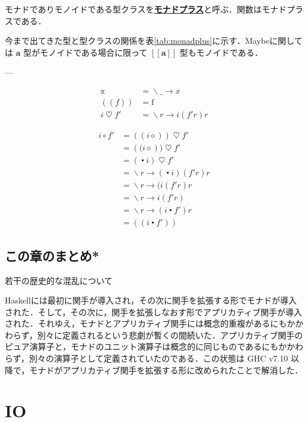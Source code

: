 \documentclass[a4paper,twocolumn]{jsbook}
\def\[{\left[\!\left[}
\def\]{\right]\!\right]}
\def\({\left(\!\left(}
\def\){\right)\!\right)}
\newcommand{\programminglanguage}[1]{\textsf{#1}}
\newcommand{\haskell}{\programminglanguage{Haskell}}
\newenvironment{note}[1]{\begin{boxnote}\begin{center}#1\end{center}}{\end{boxnote}}
\newcommand{\keyword}[1]{{\underline{\textbf{#1}}}}
\newcommand{\mConst}[1]{\mathrm{#1}}
\newcommand{\mAnonParam}{\diamond}
\newcommand{\mAnyParam}{\_}
\DeclareMathOperator{\mConst}{const}
\DeclareMathOperator{\mBind}{\heartsuit}
\DeclareMathOperator{\mComp}{\centerdot}
\DeclareMathOperator{\mLambda}{\backslash}
\DeclareMathOperator{\mLambdaArrow}{\rightarrow}
\DeclareMathOperator{\mMapFunc}{\circ}
\newcommand{\mType}[1]{\mathbf{#1}}
\newcommand{\mFuncWith}[1]{\(#1\)}
\newcommand{\mMaybeWith}[1]{\[#1\]}
\newcommand{\mMaybeType}[1]{\mMaybeWith{\mType{#1}}}
\newcommand{\mLambdaExp}[2]{\mLambda{#1}\mLambdaArrow{#2}}
\begin{document}
モナドでありモノイドである型クラスを\keyword{モナドプラス}と呼ぶ．関数はモナドプラスである．

今まで出てきた型と型クラスの関係を表\ref{tab:monadplus}に示す．Maybeに関しては $\mType{a}$ 型がモノイドである場合に限って $\mMaybeType{a}$ 型もモノイドである．

---



\begin{align}
\mConst x&=\mLambdaExp{\mAnyParam}{x}\\
\mFuncWith{f}&=\mConst f\\
i\mBind f'&=\mLambdaExp{r}{i(f'r)r}
\end{align}


\begin{align}
i\mMapFunc f'&=\mFuncWith{i\mAnonParam}\mBind f'\\
&=(\mConst(i\mAnonParam))\mBind f'\\
&=(\mConst\mComp i)\mBind f'\\
&=\mLambdaExp{r}{(\mConst\mComp i)(f'r)r}\\
&=\mLambdaExp{r}{\mConst(i(f'r)r}\\
&=\mLambdaExp{r}{i(f'r)}\\
&=\mLambdaExp{r}{(i\mComp f')r}\\
&=\mFuncWith{i\mComp f'} %
\end{align}



\section{この章のまとめ*}

\begin{note}{若干の歴史的な混乱について}
\haskell には最初に関手が導入され，その次に関手を拡張する形でモナドが導入された．そして，その次に，関手を拡張しなおす形でアプリカティブ関手が導入された．それゆえ，モナドとアプリカティブ関手には概念的重複があるにもかかわらず，別々に定義されるという悲劇が暫くの間続いた．アプリカティブ関手のピュア演算子と，モナドのユニット演算子は概念的に同じものであるにもかかわらず，別々の演算子として定義されていたのである．この状態は GHC v7.10 以降で，モナドがアプリカティブ関手を拡張する形に改められたことで解消した．
\end{note}


\chapter{IO}
\label{ch:io}
\end{document}
